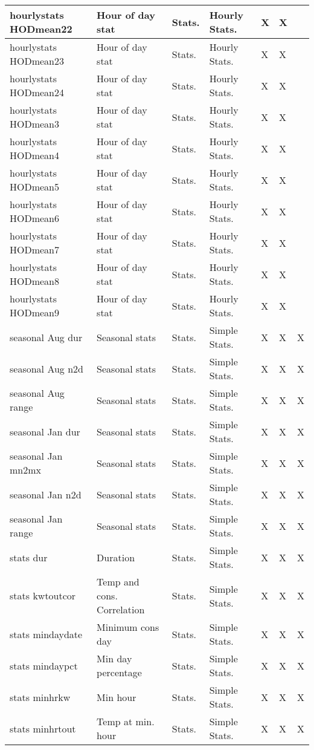 {{\begin{longtable}[l]{ | p{4cm} | p{4cm} | p{1cm} | p{2cm} | p{0.3cm} | p{0.3cm} | p{0.3cm} |}
	 hourlystats HODmean22 & Hour of day stat & Stats. & Hourly Stats. & X & X & \  \\ \hline
	 hourlystats HODmean23 & Hour of day stat & Stats. & Hourly Stats. & X & X & \  \\ \hline
	 hourlystats HODmean24 & Hour of day stat & Stats. & Hourly Stats. & X & X & \  \\ \hline
	 hourlystats HODmean3 & Hour of day stat & Stats. & Hourly Stats. & X & X & \  \\ \hline
	 hourlystats HODmean4 & Hour of day stat & Stats. & Hourly Stats. & X & X & \  \\ \hline
	 hourlystats HODmean5 & Hour of day stat & Stats. & Hourly Stats. & X & X & \  \\ \hline
	 hourlystats HODmean6 & Hour of day stat & Stats. & Hourly Stats. & X & X & \  \\ \hline
	 hourlystats HODmean7 & Hour of day stat & Stats. & Hourly Stats. & X & X & \  \\ \hline
	 hourlystats HODmean8 & Hour of day stat & Stats. & Hourly Stats. & X & X & \  \\ \hline
	 hourlystats HODmean9 & Hour of day stat & Stats. & Hourly Stats. & X & X & \  \\ \hline
	 seasonal Aug dur & Seasonal stats & Stats. & Simple Stats. & X & X & X \\ \hline
	 seasonal Aug n2d & Seasonal stats & Stats. & Simple Stats. & X & X & X \\ \hline
	 seasonal Aug range & Seasonal stats & Stats. & Simple Stats. & X & X & X \\ \hline
	 seasonal Jan dur & Seasonal stats & Stats. & Simple Stats. & X & X & X \\ \hline
	 seasonal Jan mn2mx & Seasonal stats & Stats. & Simple Stats. & X & X & X \\ \hline
	 seasonal Jan n2d & Seasonal stats & Stats. & Simple Stats. & X & X & X \\ \hline
	 seasonal Jan range & Seasonal stats & Stats. & Simple Stats. & X & X & X \\ \hline
	 stats dur & Duration & Stats. & Simple Stats. & X & X & X \\ \hline
	 stats kwtoutcor & Temp and cons. Correlation & Stats. & Simple Stats. & X & X & X \\ \hline
	 stats mindaydate & Minimum cons day  & Stats. & Simple Stats. & X & X & X \\ \hline
	 stats mindaypct & Min day percentage & Stats. & Simple Stats. & X & X & X \\ \hline
	 stats minhrkw & Min hour  & Stats. & Simple Stats. & X & X & X \\ \hline
	 stats minhrtout & Temp at min. hour & Stats. & Simple Stats. & X & X & X \\ \hline
\end{longtable}

}}
